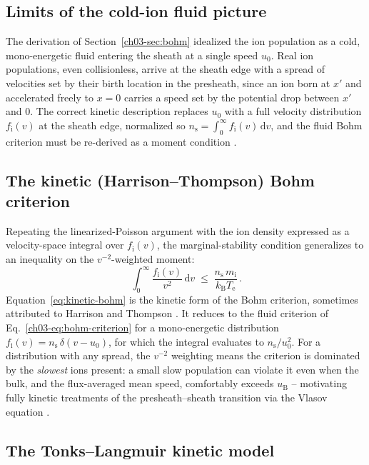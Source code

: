 \subsection{Limits of the cold-ion fluid picture}

The derivation of Section~\ref{ch03-sec:bohm} idealized the ion population as a cold, mono-energetic fluid entering the sheath at a single speed $u_{0}$. Real ion populations, even collisionless, arrive at the sheath edge with a spread of velocities set by their birth location in the presheath, since an ion born at $x'$ and accelerated freely to $x=0$ carries a speed set by the potential drop between $x'$ and $0$. The correct kinetic description replaces $u_{0}$ with a full velocity distribution $f_{\mathrm{i}}(v)$ at the sheath edge, normalized so $n_{\mathrm{s}} = \int_{0}^{\infty} f_{\mathrm{i}}(v)\, \mathrm{d}v$, and the fluid Bohm criterion must be re-derived as a moment condition \cite{ref0006}.

\subsection{The kinetic (Harrison--Thompson) Bohm criterion}

Repeating the linearized-Poisson argument with the ion density expressed as a velocity-space integral over $f_{\mathrm{i}}(v)$, the marginal-stability condition generalizes to an inequality on the $v^{-2}$-weighted moment:
\begin{equation}
\boxed{\, \int_{0}^{\infty} \frac{f_{\mathrm{i}}(v)}{v^{2}}\, \mathrm{d}v \;\le\; \frac{n_{\mathrm{s}}\, m_{\mathrm{i}}}{k_{\mathrm{B}} T_{\mathrm{e}}} \,}.
\label{eq:kinetic-bohm}
\end{equation}
Equation~\eqref{eq:kinetic-bohm} is the kinetic form of the Bohm criterion, sometimes attributed to Harrison and Thompson \cite{ref0001}. It reduces to the fluid criterion of Eq.~\eqref{ch03-eq:bohm-criterion} for a mono-energetic distribution $f_{\mathrm{i}}(v) = n_{\mathrm{s}}\, \delta(v-u_{0})$, for which the integral evaluates to $n_{\mathrm{s}}/u_{0}^{2}$. For a distribution with any spread, the $v^{-2}$ weighting means the criterion is dominated by the \emph{slowest} ions present: a small slow population can violate it even when the bulk, and the flux-averaged mean speed, comfortably exceeds $u_{\mathrm{B}}$ -- motivating fully kinetic treatments of the presheath--sheath transition via the Vlasov equation \cite{ref0659}.

\subsection{The Tonks--Langmuir kinetic model}

